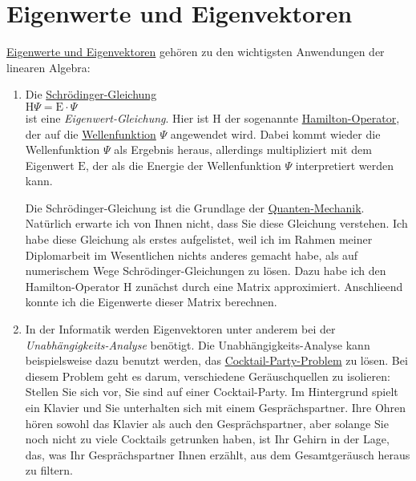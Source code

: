 \chapter{Eigenwerte und Eigenvektoren \label{chapter:eigenwerte}}
\href{https://de.wikipedia.org/wiki/Eigenwertproblem}{Eigenwerte und Eigenvektoren} geh\"oren zu den
wichtigsten Anwendungen der linearen Algebra: 
\begin{enumerate}
\item Die \href{http://de.wikipedia.org/wiki/Schr\"odingergleichung}{Schr\"odinger-Gleichung}
      \\[0.2cm]
      \hspace*{1.3cm}
      $\mathrm{H} \Psi = \mathrm{E} \cdot \Psi$
      \\[0.2cm]
      ist eine {\emph{\color{blue}Eigenwert-Gleichung}}.  Hier ist $\mathrm{H}$ der sogenannte
      \href{http://de.wikipedia.org/wiki/Hamilton-Operator}{Hamilton-Operator}, der auf die
      \href{http://de.wikipedia.org/wiki/Wellenfunktion}{Wellenfunktion} $\Psi$ angewendet wird.
      Dabei kommt wieder die Wellenfunktion $\Psi$ als Ergebnis heraus, allerdings multipliziert mit
      dem Eigenwert $\mathrm{E}$, der als die Energie der Wellenfunktion $\Psi$ interpretiert werden kann.

      Die Schr\"odinger-Gleichung ist die Grundlage der \href{http://de.wikipedia.org/wiki/Quantenmechanik}{Quanten-Mechanik}.
      Nat\"urlich erwarte ich von Ihnen nicht, dass Sie diese Gleichung verstehen.  Ich habe diese
      Gleichung als erstes aufgelistet,  weil ich im Rahmen meiner Diplomarbeit im
      Wesentlichen nichts anderes gemacht habe, als auf numerischem Wege Schr\"odinger-Gleichungen zu
      l\"osen.  Dazu habe ich den Hamilton-Operator $\mathrm{H}$ zun\"achst durch eine Matrix
      approximiert.  Anschlie\3end konnte ich die Eigenwerte dieser Matrix berechnen.  
\item In der Informatik werden Eigenvektoren unter anderem bei der 
      {\emph{\color{blue}Unabh\"angigkeits-Analyse}} ben\"otigt.  Die Unabh\"angigkeits-Analyse
      kann beispielsweise dazu benutzt werden, das
      \href{http://research.ics.aalto.fi/ica/cocktail/cocktail_en.cgi}{Cocktail-Party-Problem} zu l\"osen.
      Bei diesem Problem geht es darum, verschiedene Ger\"auschquellen zu isolieren:  Stellen
      Sie sich vor, Sie sind auf einer Cocktail-Party.  Im Hintergrund spielt ein Klavier und Sie
      unterhalten sich mit einem Gespr\"achspartner.  Ihre Ohren h\"oren sowohl das Klavier als auch den
      Gespr\"achspartner, aber solange Sie noch nicht zu viele Cocktails getrunken haben, ist Ihr
      Gehirn in der Lage, das, was Ihr Gespr\"achspartner Ihnen erz\"ahlt, aus 
      dem Gesamtger\"ausch heraus zu filtern.  


\end{enumerate}

